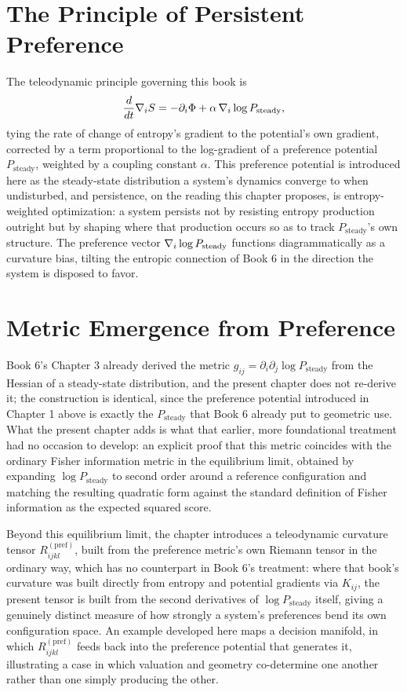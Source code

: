\chapter{The Principle of Persistent Preference}

The teleodynamic principle governing this book is
\[
\frac{d}{dt} \nabla_i S = -\partial_i \Phi + \alpha \, \nabla_i \log P_{\text{steady}},
\]
tying the rate of change of entropy's gradient to the potential's own gradient, corrected by a term proportional to the log-gradient of a preference potential $P_{\text{steady}}$, weighted by a coupling constant $\alpha$. This preference potential is introduced here as the steady-state distribution a system's dynamics converge to when undisturbed, and persistence, on the reading this chapter proposes, is entropy-weighted optimization: a system persists not by resisting entropy production outright but by shaping where that production occurs so as to track $P_{\text{steady}}$'s own structure. The preference vector $\nabla_i \log P_{\text{steady}}$ functions diagrammatically as a curvature bias, tilting the entropic connection of Book 6 in the direction the system is disposed to favor.

\chapter{Metric Emergence from Preference}

Book 6's Chapter 3 already derived the metric $g_{ij} = \partial_i \partial_j \log P_{\text{steady}}$ from the Hessian of a steady-state distribution, and the present chapter does not re-derive it; the construction is identical, since the preference potential introduced in Chapter 1 above is exactly the $P_{\text{steady}}$ that Book 6 already put to geometric use. What the present chapter adds is what that earlier, more foundational treatment had no occasion to develop: an explicit proof that this metric coincides with the ordinary Fisher information metric in the equilibrium limit, obtained by expanding $\log P_{\text{steady}}$ to second order around a reference configuration and matching the resulting quadratic form against the standard definition of Fisher information as the expected squared score.

Beyond this equilibrium limit, the chapter introduces a teleodynamic curvature tensor $R^{(\text{pref})}_{ijkl}$, built from the preference metric's own Riemann tensor in the ordinary way, which has no counterpart in Book 6's treatment: where that book's curvature was built directly from entropy and potential gradients via $K_{ij}$, the present tensor is built from the second derivatives of $\log P_{\text{steady}}$ itself, giving a genuinely distinct measure of how strongly a system's preferences bend its own configuration space. An example developed here maps a decision manifold, in which $R^{(\text{pref})}_{ijkl}$ feeds back into the preference potential that generates it, illustrating a case in which valuation and geometry co-determine one another rather than one simply producing the other.

